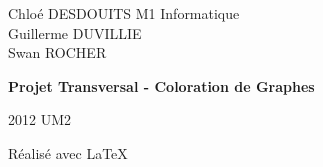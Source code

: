 \documentclass[a4paper]{report}
\begin{document}
\large
\setlength{\parskip}{5mm plus3mm minus3mm}

 
{\setlength{\parindent}{0cm}
Chlo\'e DESDOUITS \hfill M1 Informatique \\
Guillerme DUVILLIE \\
Swan ROCHER
}
\vfill
{\centering \Huge \bfseries Projet Transversal - Coloration de Graphes\par}
\vfill
2012 \hfill UM2

\tableofcontents
\thispagestyle{empty}





\vfill
{\raggedleft R\'ealis\'e avec \LaTeX{} \par}
\end{document}
